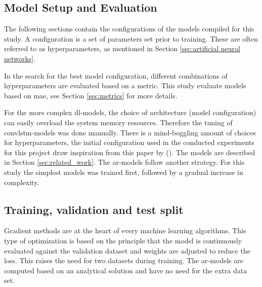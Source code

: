 \subsection{Model Setup and Evaluation}
The following sections contain the configurations of the models compiled for this study. A configuration is a set of parameters set prior to training. These are often referred to as hyperparameters, as mentioned in Section \ref{sec:artificial neural networks}.

In the search for the best model configuration, different combinations of hyperparameters are evaluated based on a metric. %
This study evaluate models based on \acrfull{mae}, see Section \ref{sec:metrics} for more details.

For the more complex \acrshort{dl}-models, the choice of architecture (model configuration) can easily overload the system memory resources. Therefore the tuning of \acrshort{convlstm}-models was done manually. There is a mind-boggling amount of choices for hyperparameters, the initial configuration used in the conducted experiments for this project draw inspiration from this paper by \citeauthor{SunAirLSTM} (\citeyear{SunAirLSTM}).
The models are described in Section \ref{sec:related_work}.
The \acrshort{ar}-models follow another strategy. For this study the simplest models was trained first, followed by a gradual increase in complexity.

\subsection{Training, validation and test split}
Gradient methods are at the heart of every machine 
learning algorithms. This type of optimization is based on the principle that the model is continuously evaluated against the validation dataset and weights are adjusted to reduce the loss. This raises the need for two datasets during training. The \acrshort{ar}-models are computed based on an analytical solution and have no need for the extra data set. 

